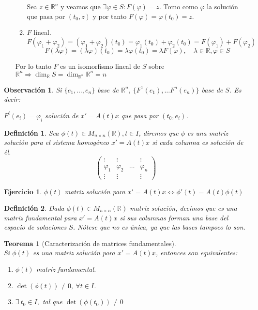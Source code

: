 \documentclass{article}
\makeatletter
\theoremstyle{theorem-style}  %
\newtheorem{theorem}{Teorema}[section]  %
\theoremstyle{definition-style}
\newtheorem{definition}{Definición}[section]
\newtheorem*{observation}{Observación} %
\theoremstyle{example-style}
\newtheorem{exercise}{Ejercicio}[section]
\renewenvironment{proof}[1][\proofname]{\par
	\pushQED{\qed}%
	\normalfont \topsep6\p@\@plus6\p@\relax
	\list{}{%
		\settowidth{\leftmargin}{\quad:\hskip\labelsep}%
		\setlength{\labelwidth}{0pt}%
		\setlength{\itemindent}{-\leftmargin}%
	}%
	\item[\hskip\labelsep\itshape#1\@addpunct{:}]\ignorespaces
}{%
	\popQED\endlist\@endpefalse
}
\makeatother
\begin{document}
\begin{proof}
\begin{enumerate}
\begin{enumerate}[\quad i)]
			Sea $ z \in \mathbb{R}^n $ y veamos que $ \exists \varphi \in S : F(\varphi)=z $. Tomo como $ \varphi $ la solución que pasa por $ (t_0, z) $ y por tanto $ F(\varphi)=\varphi(t_0)=z $.	
			\item $ F $ lineal. 
			\[  F(\varphi_1+\varphi_2)=(\varphi_1+\varphi_2)(t_0)=\varphi_1(t_0)+\varphi_2(t_0)=F(\varphi_1)+F(\varphi_2)  \]
			\[ F(\lambda\varphi)=(\lambda\varphi)(t_0)=\lambda \varphi(t_0)= \lambda F(\varphi), \quad \lambda \in \mathbb{R}, \varphi \in S \]	
			
		\end{enumerate}
		Por lo tanto $ F $ es un isomorfismo lineal de $ S $ sobre $ \mathbb{R}^n \Rightarrow \dim_\mathbb{R}S=\dim_{\mathbb{R}^n}\mathbb{R}^n=n $
	\end{enumerate}
\end{proof}
\begin{observation}
	Si $ \{e_1, \dots, e_n\} $ base de $ \mathbb{R}^n $, $ \{ F^1(e_1), \dots F^n(e_n) \} $ base de $ S $. Es decir:
	
	$ F^i(e_i)=\varphi_i $ solución de $ x'=A(t)x $ que pasa por $ (t_0, e_i) $.
\end{observation}
\begin{definition}
	Sea $ \phi(t) \in M_{n\times n}(\mathbb{R}), t\in I$, diremos que $ \phi $ es una \emph{matriz solución para el sistema homogéneo} $ x'=A(t)x $ si cada columna es solución de él. 
	\[ \begin{pmatrix}
	\vdots & \vdots  &&\vdots\\
	\varphi_1  & \varphi_2 & \dots&\varphi_n \\
	\vdots & \vdots  &&\vdots
	\end{pmatrix}  \]
\end{definition}
\begin{exercise}
	$ \phi(t) $ matriz solución para $ x'=A(t)x \Leftrightarrow \phi'(t)=A(t)\phi(t) $
\end{exercise}
\begin{definition}
	Dada $ \phi(t)\in M_{n\times n}(\mathbb{R}) $ matriz solución, decimos que es una \emph{matriz fundamental} para $ x'=A(t)x $ si sus columnas forman una base del espacio de soluciones $ S $. Nótese que no es única, ya que las bases tampoco lo son.
\end{definition}
\begin{theorem}[Caracterización de matrices fundamentales]\label{matfund-carac}\ \\
	Si $ \phi(t) $ es una matriz solución para $ x'=A(t)x $, entonces son equivalentes:
	\begin{enumerate}[\quad i)]
		\item $ \phi(t)$ matriz fundamental.
		\item $ \det(\phi(t))\neq 0, \ \forall t \in I $.
		\item $ \exists \ t_0 \in I,$ tal que $ \det(\phi(t_0))\neq 0 $
	\end{enumerate}
\end{theorem}
\end{document}
